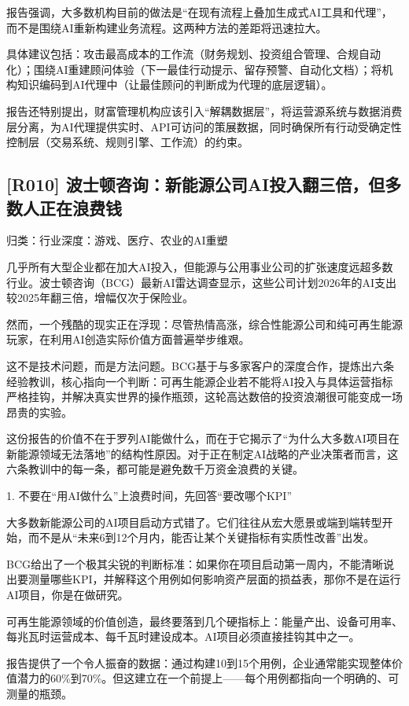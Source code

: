 \documentclass[11pt]{ctexart}
\begin{document}
报告强调，大多数机构目前的做法是“在现有流程上叠加生成式AI工具和代理”，而不是围绕AI重新构建业务流程。这两种方法的差距将迅速拉大。

具体建议包括：攻击最高成本的工作流（财务规划、投资组合管理、合规自动化）；围绕AI重建顾问体验（下一最佳行动提示、留存预警、自动化文档）；将机构知识编码到AI代理中（让最佳顾问的判断成为代理的底层逻辑）。

报告还特别提出，财富管理机构应该引入“解耦数据层”，将运营源系统与数据消费层分离，为AI代理提供实时、API可访问的策展数据，同时确保所有行动受确定性控制层（交易系统、规则引擎、工作流）的约束。

\subsection{[R010] 波士顿咨询：新能源公司AI投入翻三倍，但多数人正在浪费钱}
{\small\color{refgray}归类：行业深度：游戏、医疗、农业的AI重塑}

几乎所有大型企业都在加大AI投入，但能源与公用事业公司的扩张速度远超多数行业。波士顿咨询（BCG）最新AI雷达调查显示，这些公司计划2026年的AI支出较2025年翻三倍，增幅仅次于保险业。

然而，一个残酷的现实正在浮现：尽管热情高涨，综合性能源公司和纯可再生能源玩家，在利用AI创造实际价值方面普遍举步维艰。

这不是技术问题，而是方法问题。BCG基于与多家客户的深度合作，提炼出六条经验教训，核心指向一个判断：可再生能源企业若不能将AI投入与具体运营指标严格挂钩，并解决真实世界的操作瓶颈，这轮高达数倍的投资浪潮很可能变成一场昂贵的实验。

这份报告的价值不在于罗列AI能做什么，而在于它揭示了“为什么大多数AI项目在新能源领域无法落地”的结构性原因。对于正在制定AI战略的产业决策者而言，这六条教训中的每一条，都可能是避免数千万资金浪费的关键。

1. 不要在“用AI做什么”上浪费时间，先回答“要改哪个KPI”

大多数新能源公司的AI项目启动方式错了。它们往往从宏大愿景或端到端转型开始，而不是从“未来6到12个月内，能否让某个关键指标有实质性改善”出发。

BCG给出了一个极其尖锐的判断标准：如果你在项目启动第一周内，不能清晰说出要测量哪些KPI，并解释这个用例如何影响资产层面的损益表，那你不是在运行AI项目，你是在做研究。

可再生能源领域的价值创造，最终要落到几个硬指标上：能量产出、设备可用率、每兆瓦时运营成本、每千瓦时建设成本。AI项目必须直接挂钩其中之一。

报告提供了一个令人振奋的数据：通过构建10到15个用例，企业通常能实现整体价值潜力的60\%到70\%。但这建立在一个前提上——每个用例都指向一个明确的、可测量的瓶颈。
\end{document}
